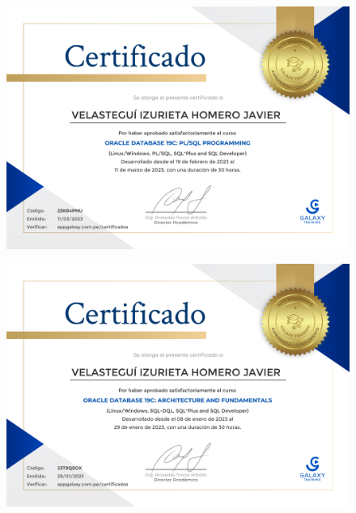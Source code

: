 \begin{figure}[ht]
    \setlength{\parindent}{-20pt}
    \includegraphics[width=\textwidth]{2.-Estudios/Certificados/13.pdf}
\end{figure}

\begin{figure}[ht]
    \setlength{\parindent}{-20pt}
    \includegraphics[width=\textwidth]{2.-Estudios/Certificados/12.pdf}
\end{figure}

